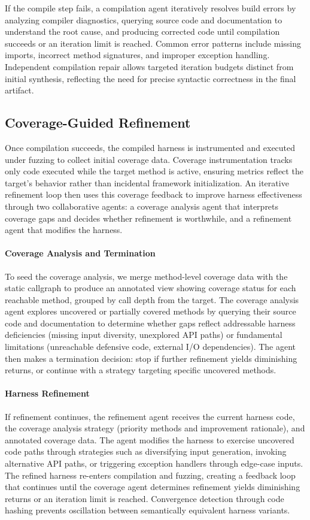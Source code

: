 If the compile step fails, a compilation agent iteratively resolves build errors by analyzing compiler diagnostics, querying source code and documentation to understand the root cause, and producing corrected code until compilation succeeds or an iteration limit is reached. Common error patterns include missing imports, incorrect method signatures, and improper exception handling. Independent compilation repair allows targeted iteration budgets distinct from initial synthesis, reflecting the need for precise syntactic correctness in the final artifact.
\subsection{Coverage-Guided Refinement}%
\label{subsec:coverage-guided-refinement}

Once compilation succeeds, the compiled harness is instrumented and executed under fuzzing to collect initial coverage data. Coverage instrumentation tracks only code executed while the target method is active, ensuring metrics reflect the target's behavior rather than incidental framework initialization. An iterative refinement loop then uses this coverage feedback to improve harness effectiveness through two collaborative agents: a coverage analysis agent that interprets coverage gaps and decides whether refinement is worthwhile, and a refinement agent that modifies the harness.

\paragraph{Coverage Analysis and Termination}
To seed the coverage analysis, we merge method-level coverage data with the static callgraph to produce an annotated view showing coverage status for each reachable method, grouped by call depth from the target. The coverage analysis agent explores uncovered or partially covered methods by querying their source code and documentation to determine whether gaps reflect addressable harness deficiencies (missing input diversity, unexplored API paths) or fundamental limitations (unreachable defensive code, external I/O dependencies). The agent then makes a termination decision: stop if further refinement yields diminishing returns, or continue with a strategy targeting specific uncovered methods.

\paragraph{Harness Refinement}
If refinement continues, the refinement agent receives the current harness code, the coverage analysis strategy (priority methods and improvement rationale), and annotated coverage data. The agent modifies the harness to exercise uncovered code paths through strategies such as diversifying input generation, invoking alternative API paths, or triggering exception handlers through edge-case inputs. The refined harness re-enters compilation and fuzzing, creating a feedback loop that continues until the coverage agent determines refinement yields diminishing returns or an iteration limit is reached. Convergence detection through code hashing prevents oscillation between semantically equivalent harness variants.
